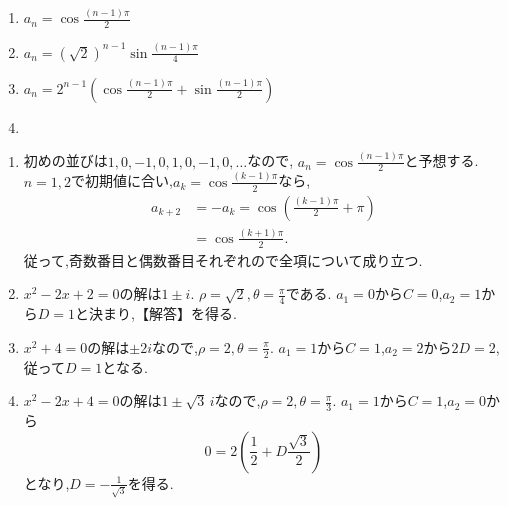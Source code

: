 \noindent{}\par\nobreak
\begin{enumerate}[label=(\arabic*),parsep=3pt,format=\bookitemlink{example-complex-1}{answer}{solution}]
  \item $a_n=\cos\frac{(n-1)\pi}{2}$
  \item $a_n=(\sqrt2)^{n-1}\sin\frac{(n-1)\pi}{4}$
  \item $a_n=2^{n-1}\left(\cos\frac{(n-1)\pi}{2}+\sin\frac{(n-1)\pi}{2}\right)$
  \item {}
\end{enumerate}

\noindent{}\par\nobreak
\begin{enumerate}[label=(\arabic*),parsep=3pt,format=\bookitemlink{example-complex-1}{solution}{problem}]
  \item 初めの並びは$1,0,-1,0,1,0,-1,0,\ldots$なので,
    $a_n=\cos\frac{(n-1)\pi}{2}$と予想する.
    $n=1,2$で初期値に合い,$a_k=\cos\frac{(k-1)\pi}{2}$なら,
    \[
      \begin{aligned}
        a_{k+2}&=-a_k=\cos\left(\frac{(k-1)\pi}{2}+\pi\right)\\
        &=\cos\frac{(k+1)\pi}{2}.
      \end{aligned}
    \]
    従って,奇数番目と偶数番目それぞれので全項について成り立つ.
  \item {}$x^2-2x+2=0$の解は$1\pm i$.
    $\rho=\sqrt2,\theta=\frac{\pi}{4}$である.
    $a_1=0$から$C=0$,$a_2=1$から$D=1$と決まり,【解答】を得る.
  \item $x^2+4=0$の解は$\pm2i$なので,$\rho=2,\theta=\frac{\pi}{2}$.
    $a_1=1$から$C=1$,$a_2=2$から$2D=2$,従って$D=1$となる.
  \item $x^2-2x+4=0$の解は$1\pm\sqrt3\,i$なので,$\rho=2,\theta=\frac{\pi}{3}$.
    $a_1=1$から$C=1$,$a_2=0$から
    \[
      0=2\left(\frac{1}{2}+D\frac{\sqrt3}{2}\right)
    \]
    となり,$D=-\frac{1}{\sqrt3}$を得る.
\end{enumerate}
